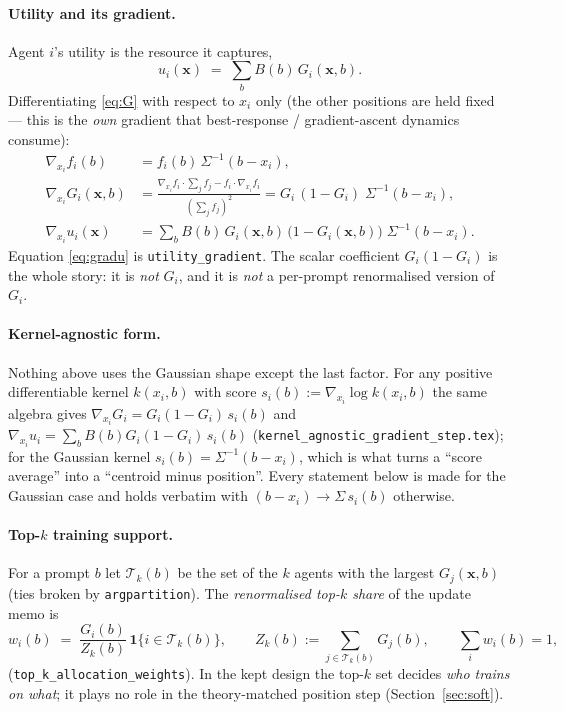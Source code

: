 \documentclass[11pt]{article}
\theoremstyle{remark}
\newcommand{\ind}[1]{\mathbf{1}\{#1\}}
\newcommand{\bx}{\mathbf{x}}
\newcommand{\Sig}{\Sigma}
\newcommand{\Tk}{\mathcal{T}_k}
\begin{document}
\paragraph{Utility and its gradient.}
Agent $i$'s utility is the resource it captures,
\begin{equation}
  u_i(\bx) \;=\; \sum_b B(b)\,G_i(\bx,b).
  \label{eq:u}
\end{equation}
Differentiating \eqref{eq:G} with respect to $x_i$ only (the other positions
are held fixed --- this is the \emph{own} gradient that best-response /
gradient-ascent dynamics consume):
\begin{align}
  \nabla_{x_i} f_i(b) &= f_i(b)\,\Sig^{-1}(b-x_i),\\
  \nabla_{x_i} G_i(\bx,b)
    &= \frac{\nabla_{x_i} f_i \cdot \sum_j f_j - f_i\cdot \nabla_{x_i} f_i}{(\sum_j f_j)^2}
     = G_i\,(1-G_i)\;\Sig^{-1}(b-x_i),
  \label{eq:gradG}\\
  \nabla_{x_i} u_i(\bx)
    &= \sum_b B(b)\,G_i(\bx,b)\,\big(1-G_i(\bx,b)\big)\;\Sig^{-1}(b-x_i).
  \label{eq:gradu}
\end{align}
Equation \eqref{eq:gradu} is \texttt{utility\_gradient}. The scalar
coefficient $G_i(1-G_i)$ is the whole story: it is \emph{not} $G_i$, and it is
\emph{not} a per-prompt renormalised version of $G_i$.

\paragraph{Kernel-agnostic form.}
Nothing above uses the Gaussian shape except the last factor. For any
positive differentiable kernel $k(x_i,b)$ with score
$s_i(b):=\nabla_{x_i}\log k(x_i,b)$ the same algebra gives
$\nabla_{x_i}G_i = G_i(1-G_i)\,s_i(b)$ and
$\nabla_{x_i}u_i=\sum_b B(b)G_i(1-G_i)\,s_i(b)$
(\texttt{kernel\_agnostic\_gradient\_step.tex}); for the Gaussian kernel
$s_i(b)=\Sig^{-1}(b-x_i)$, which is what turns a ``score average'' into a
``centroid minus position''. Every statement below is made for the Gaussian
case and holds verbatim with $(b-x_i)\to\Sig\,s_i(b)$ otherwise.

\paragraph{Top-$k$ training support.}
For a prompt $b$ let $\Tk(b)$ be the set of the $k$ agents with the largest
$G_j(\bx,b)$ (ties broken by \texttt{argpartition}). The \emph{renormalised
top-$k$ share} of the update memo is
\begin{equation}
  w_i(b) \;=\; \frac{G_i(b)}{Z_k(b)}\,\ind{i\in\Tk(b)},
  \qquad Z_k(b) := \sum_{j\in\Tk(b)} G_j(b),
  \qquad \sum_i w_i(b)=1 ,
  \label{eq:wtopk}
\end{equation}
(\texttt{top\_k\_allocation\_weights}). In the kept design the top-$k$ set
decides \emph{who trains on what}; it plays no role in the theory-matched
position step (Section~\ref{sec:soft}).
\end{document}
